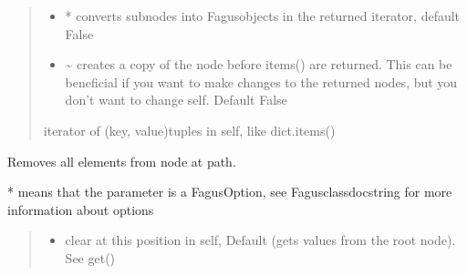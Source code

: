 \documentclass[a4paper,10pt,english]{sphinxmanual}
\begin{document}
\begin{fulllineitems}
\begin{fulllineitems}
\begin{quote}
\begin{description}
\begin{itemize}
\item {}
\sphinxAtStartPar
{} \textendash{} * converts sub\sphinxhyphen{}nodes into Fagus\sphinxhyphen{}objects in the returned iterator, default False

\item {}
\sphinxAtStartPar
{} \textendash{} \textasciitilde{} creates a copy of the node before items() are returned. This can be beneficial if you want to make
changes to the returned nodes, but you don’t want to change self. Default False

\end{itemize}

\sphinxAtStartPar
iterator of (key, value)\sphinxhyphen{}tuples in self, like dict.items()

\end{description}\end{quote}

\end{fulllineitems}


\begin{fulllineitems}
\label{\detokenize{fagus:fagus.Fagus.clear}}
\pysigstartsignatures
{}
\pysigstopsignatures
\sphinxAtStartPar
Removes all elements from node at path.

\sphinxAtStartPar
* means that the parameter is a FagusOption, see Fagus\sphinxhyphen{}class\sphinxhyphen{}docstring for more information about options
\begin{quote}\begin{description}
\begin{itemize}
\item {}
\sphinxAtStartPar
{} \textendash{} clear at this position in self, Default  (gets values from the root node). See get()


\end{itemize}
\end{description}
\end{quote}
\end{fulllineitems}
\end{fulllineitems}
\end{document}
